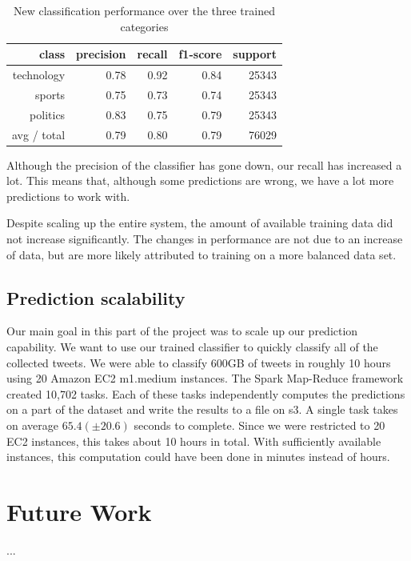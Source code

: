 \documentclass{llncs}
\begin{document}
\begin{table}
	\begin{center}
		\begin{tabular}{|r|r|r|r|r|} \hline
			class  & precision   & recall & f1-score  & support \\ \hline
			technology    &   0.78 &     0.92  &    0.84   &  25343 \\
			sports   &    0.75   &   0.73   &   0.74   &   25343 \\
			politics   &    0.83  &    0.75   &   0.79   &   25343 \\
			avg / total  &     0.79   &   0.80  &    0.79   &  76029 \\ \hline
		\end{tabular}
	\end{center}
	\caption{New classification performance over the three trained categories}
	\label{tbl:newclassifier}
\end{table}

Although the precision of the classifier has gone down, our recall has increased a lot. This means that, although some predictions are wrong, we have a lot more predictions to work with.

Despite scaling up the entire system, the amount of available training data did not increase significantly. The changes in performance are not due to an increase of data, but are more likely attributed to training on a more balanced data set.

\subsection{Prediction scalability}

Our main goal in this part of the project was to scale up our prediction capability. We want to use our trained classifier to quickly classify all of the collected tweets. We were able to classify 600GB of tweets in roughly 10 hours using 20 Amazon EC2 m1.medium instances. The Spark Map-Reduce framework created 10,702 tasks. Each of these tasks independently computes the predictions on a part of the dataset and write the results to a file on s3. A single task takes on average $65.4 (\pm 20.6)$ seconds to complete. Since we were restricted to 20 EC2 instances, this takes about 10 hours in total. With sufficiently available instances, this computation could have been done in minutes instead of hours.

\section{Future Work}
...






\end{document}
